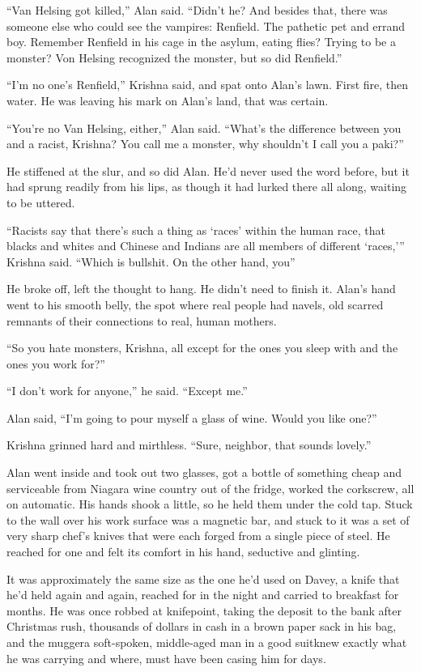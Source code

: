 ``Van Helsing got killed,'' Alan said.  ``Didn't he?  And besides
that, there was someone else who could see the vampires:  Renfield. 
The pathetic pet and errand boy.  Remember Renfield in his cage in the
asylum, eating flies?  Trying to be a monster?  Von Helsing recognized
the monster, but so did Renfield.''

``I'm no one's Renfield,'' Krishna said, and spat onto Alan's lawn. 
First fire, then water.  He was leaving his mark on Alan's land, that
was certain.

``You're no Van Helsing, either,'' Alan said.  ``What's the difference
between you and a racist, Krishna?  You call me a monster, why
shouldn't I call you a paki?''

He stiffened at the slur, and so did Alan.  He'd never used the word
before, but it had sprung readily from his lips, as though it had
lurked there all along, waiting to be uttered.

``Racists say that there's such a thing as `races' within the human
race, that blacks and whites and Chinese and Indians are all members
of different `races,''' Krishna said.  ``Which is bullshit.  On the
other hand, you\dash{}''

He broke off, left the thought to hang.  He didn't need to finish it. 
Alan's hand went to his smooth belly, the spot where real people had
navels, old scarred remnants of their connections to real, human
mothers.

``So you hate monsters, Krishna, all except for the ones you sleep
with and the ones you work for?''

``I don't work for anyone,'' he said.  ``Except me.''

Alan said, ``I'm going to pour myself a glass of wine.  Would you like
one?''

Krishna grinned hard and mirthless.  ``Sure, neighbor, that sounds
lovely.''

Alan went inside and took out two glasses, got a bottle of something
cheap and serviceable from Niagara wine country out of the fridge,
worked the corkscrew, all on automatic.  His hands shook a little, so
he held them under the cold tap.  Stuck to the wall over his work
surface was a magnetic bar, and stuck to it was a set of very sharp
chef's knives that were each forged from a single piece of steel.  He
reached for one and felt its comfort in his hand, seductive and
glinting.

It was approximately the same size as the one he'd used on Davey, a
knife that he'd held again and again, reached for in the night and
carried to breakfast for months.  He was once robbed at knifepoint,
taking the deposit to the bank after Christmas rush, thousands of
dollars in cash in a brown paper sack in his bag, and the mugger\dash{}a
soft-spoken, middle-aged man in a good suit\dash{}knew exactly what he was
carrying and where, must have been casing him for days.

